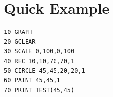 \documentclass[10pt]{article}
\begin{document}
\section{Quick Example}
\begin{verbatim}
10 GRAPH
20 GCLEAR
30 SCALE 0,100,0,100
40 REC 10,10,70,70,1
50 CIRCLE 45,45,20,20,1
60 PAINT 45,45,1
70 PRINT TEST(45,45)
\end{verbatim}
\end{document}
